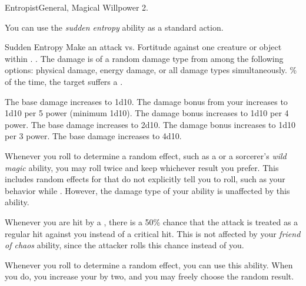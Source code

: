     \begin{magicalfeat}{Entropist}{General, Magical}
        \featpre Willpower 2.

         You can use the \textit{sudden entropy} ability as a standard action.
        \begin{magicalactiveability}{Sudden Entropy}
            \rankline
            Make an attack vs. Fortitude against one creature or object within \shortrange.
            \hit \damageranktwo{}.
            The damage is of a random damage type from among the following options: physical damage, energy damage, or all damage types simultaneously.
            \% of the time, the target suffers a .

            \rankline
             The base damage increases to 1d10.
             The damage bonus from your  increases to 1d10 per 5 power (minimum 1d10).
             The damage bonus increases to 1d10 per 4 power.
             The base damage increases to 2d10.
             The damage bonus increases to 1d10 per 3 power.
             The base damage increases to 4d10.
        \end{magicalactiveability}

         Whenever you roll to determine a random effect, such as a  or a sorcerer's \textit{wild magic} ability, you may roll twice and keep whichever result you prefer.
        This includes random effects for that do not explicitly tell you to roll, such as your behavior while \confused.
        However, the damage type of your  ability is unaffected by this ability.

         Whenever you are hit by a , there is a 50\% chance that the attack is treated as a regular hit against you instead of a critical hit.
        This is not affected by your \textit{friend of chaos} ability, since the attacker rolls this chance instead of you.

         Whenever you roll to determine a random effect, you can use this ability.
        When you do, you increase your  by two, and you may freely choose the random result.
    \end{magicalfeat}

